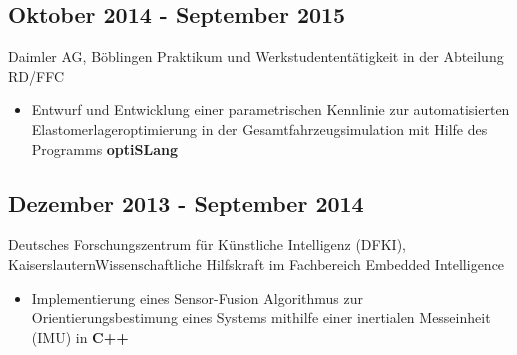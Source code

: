 \documentclass{mycv}
\begin{document}
{\rlap{\color{templateColor1}\rule[0mm]{\textwidth}{\ulinewidth}}}
\begin{paracol}{2}

\switchcolumn
{}
		\subsection{Oktober 2014 - September 2015}{Daimler AG, B{\"o}blingen}
		{Praktikum und Werkstudentent{\"a}tigkeit in der Abteilung RD/FFC}
	  \begin{itemize}
			\item Entwurf und Entwicklung einer parametrischen Kennlinie zur
				automatisierten Elastomerlageroptimierung in der
				Gesamtfahrzeugsimulation mit Hilfe des Programms {\bfseries
				optiSLang}\\
		\end{itemize}

		\subsection{Dezember 2013 - September 2014}{Deutsches Forschungszentrum
			f{\"u}r K{\"u}nstliche Intelligenz (DFKI),
		Kaiserslautern}{Wissenschaftliche Hilfskraft im Fachbereich Embedded
		Intelligence} 
	  \begin{itemize}
			\item Implementierung eines Sensor-Fusion Algorithmus zur
				Orientierungsbestimung eines Systems mithilfe einer inertialen
				Messeinheit (IMU) in {\bfseries C++}\\
	  \end{itemize}



\end{paracol}
\end{document}

